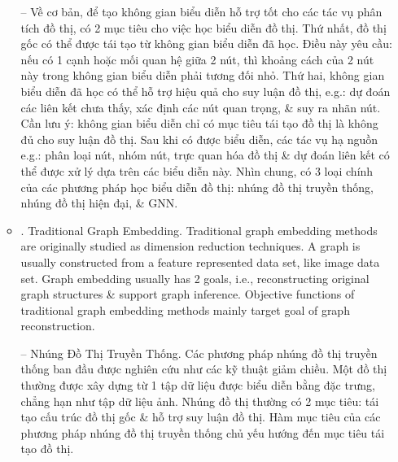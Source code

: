 \documentclass{article}
\begin{document}
\begin{itemize}
\begin{itemize}
        -- Về cơ bản, để tạo không gian biểu diễn hỗ trợ tốt cho các tác vụ phân tích đồ thị, có 2 mục tiêu cho việc học biểu diễn đồ thị. Thứ nhất, đồ thị gốc có thể được tái tạo từ không gian biểu diễn đã học. Điều này yêu cầu: nếu có 1 cạnh hoặc mối quan hệ giữa 2 nút, thì khoảng cách của 2 nút này trong không gian biểu diễn phải tương đối nhỏ. Thứ hai, không gian biểu diễn đã học có thể hỗ trợ hiệu quả cho suy luận đồ thị, e.g.: dự đoán các liên kết chưa thấy, xác định các nút quan trọng, \& suy ra nhãn nút. Cần lưu ý: không gian biểu diễn chỉ có mục tiêu tái tạo đồ thị là không đủ cho suy luận đồ thị. Sau khi có được biểu diễn, các tác vụ hạ nguồn e.g.: phân loại nút, nhóm nút, trực quan hóa đồ thị \& dự đoán liên kết có thể được xử lý dựa trên các biểu diễn này. Nhìn chung, có 3 loại chính của các phương pháp học biểu diễn đồ thị: nhúng đồ thị truyền thống, nhúng đồ thị hiện đại, \& GNN.
        \item {. Traditional Graph Embedding.} Traditional graph embedding methods are originally studied as dimension reduction techniques. A graph is usually constructed from a feature represented data set, like image data set. Graph embedding usually has 2 goals, i.e., reconstructing original graph structures \& support graph inference. Objective functions of traditional graph embedding methods mainly target goal of graph reconstruction.

        -- {\sf Nhúng Đồ Thị Truyền Thống.} Các phương pháp nhúng đồ thị truyền thống ban đầu được nghiên cứu như các kỹ thuật giảm chiều. Một đồ thị thường được xây dựng từ 1 tập dữ liệu được biểu diễn bằng đặc trưng, chẳng hạn như tập dữ liệu ảnh. Nhúng đồ thị thường có 2 mục tiêu: tái tạo cấu trúc đồ thị gốc \& hỗ trợ suy luận đồ thị. Hàm mục tiêu của các phương pháp nhúng đồ thị truyền thống chủ yếu hướng đến mục tiêu tái tạo đồ thị.


\end{itemize}
\end{itemize}
\end{document}
